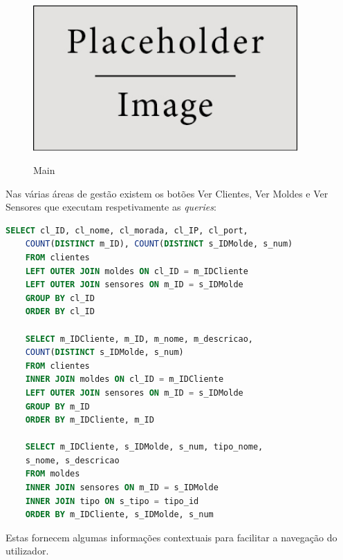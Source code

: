 \documentclass[11pt,twoside,a4paper]{report}
\begin{document}
\begin{figure}[H]
\begin{minipage}{.5\textwidth}
\begin{center}
		\end{center}
	\end{minipage}
	\begin{minipage}{.5\textwidth}
		\begin{center}
			\includegraphics[width=0.9\textwidth]{placeholder} %
			\label{fig:admin7}
		\end{center}
	\end{minipage}
	\caption{Main}
	\label{fig:admin4}
\end{figure}
Nas várias áreas de gestão existem os botões Ver Clientes, Ver Moldes e Ver Sensores que executam respetivamente as \textit{queries}:
\begin{lstlisting}[language = SQL]
	SELECT cl_ID, cl_nome, cl_morada, cl_IP, cl_port,
	COUNT(DISTINCT m_ID), COUNT(DISTINCT s_IDMolde, s_num)
	FROM clientes
	LEFT OUTER JOIN moldes ON cl_ID = m_IDCliente
	LEFT OUTER JOIN sensores ON m_ID = s_IDMolde
	GROUP BY cl_ID
	ORDER BY cl_ID
	
	SELECT m_IDCliente, m_ID, m_nome, m_descricao,
	COUNT(DISTINCT s_IDMolde, s_num)
	FROM clientes
	INNER JOIN moldes ON cl_ID = m_IDCliente
	LEFT OUTER JOIN sensores ON m_ID = s_IDMolde
	GROUP BY m_ID
	ORDER BY m_IDCliente, m_ID
	
	SELECT m_IDCliente, s_IDMolde, s_num, tipo_nome,
	s_nome, s_descricao
	FROM moldes
	INNER JOIN sensores ON m_ID = s_IDMolde
	INNER JOIN tipo ON s_tipo = tipo_id
	ORDER BY m_IDCliente, s_IDMolde, s_num
\end{lstlisting}
Estas fornecem algumas informações contextuais para facilitar a navegação do utilizador.
\end{document}
